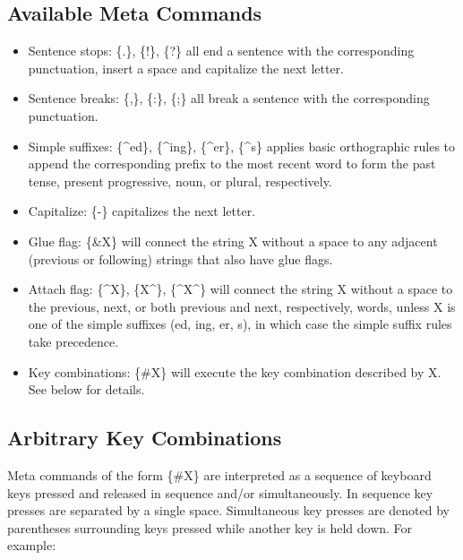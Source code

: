 \documentclass[11pt]{article}
\newcommand{\meta}[1]{\{#1\}}
\begin{document}
\subsection{Available Meta Commands}
\begin{itemize}

\item Sentence stops: \meta{.}, \meta{!}, \meta{?} all end a sentence
  with the corresponding punctuation, insert a space and capitalize
  the next letter.

\item Sentence breaks: \meta{,}, \meta{:}, \meta{;} all break a
  sentence with the corresponding punctuation.
  
\item Simple suffixes: \meta{\^{ }ed}, \meta{\^{ }ing}, \meta{\^{ }er},
  \meta{\^{ }s} applies basic orthographic rules to append the
  corresponding prefix to the most recent word to form the past tense,
  present progressive, noun, or plural, respectively.

\item Capitalize: \meta{-\textbar} capitalizes the next letter.

\item Glue flag: \meta{\&X} will connect the string X without a space to any
  adjacent (previous or following) strings that also have glue flags.

\item Attach flag: \meta{\^{ }X}, \meta{X\^{ }}, \meta{\^{ }X\^{ }} will connect
  the string X without a space to the previous, next, or both previous
  and next, respectively, words, unless X is one of the simple
  suffixes (ed, ing, er, s), in which case the simple suffix rules
  take precedence.

\item Key combinations: \meta{\#X} will execute the key combination
  described by X. See below for details.

\end{itemize}

\subsection{Arbitrary Key Combinations}

Meta commands of the form \meta{\#X} are interpreted as a sequence of
keyboard keys pressed and released in sequence and/or
simultaneously. In sequence key presses are separated by a single
space. Simultaneous key presses are denoted by parentheses surrounding
keys pressed while another key is held down. For example:
\end{document}
